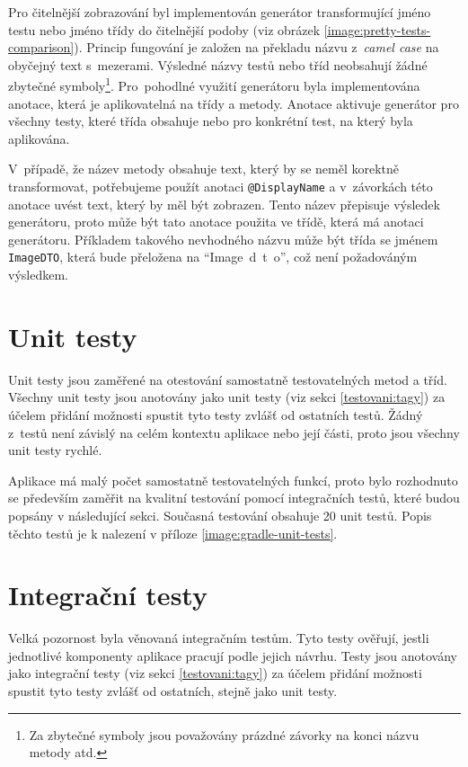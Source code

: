     Pro čitelnější zobrazování byl implementován generátor transformující jméno testu nebo jméno třídy do čitelnější podoby (viz obrázek \ref{image:pretty-tests-comparison}). Princip fungování je založen na překladu názvu z~\textit{camel case} na obyčejný text s~mezerami. Výsledné názvy testů nebo tříd neobsahují žádné zbytečné symboly\footnote{Za zbytečné symboly jsou považovány prázdné závorky na konci názvu metody atd.}. Pro~pohodlné využití generátoru byla implementována anotace, která je aplikovatelná na třídy a metody. Anotace aktivuje generátor pro všechny testy, které třída obsahuje nebo pro konkrétní test, na který byla aplikována.
    
    V~případě, že název metody obsahuje text, který by se neměl korektně transformovat, potřebujeme použít anotaci \verb|@DisplayName| a v~závorkách této anotace uvést text, který by měl být zobrazen. Tento název přepisuje výsledek generátoru, proto může být tato anotace použita ve třídě, která má anotaci generátoru. Příkladem takového nevhodného názvu může být třída se jménem \verb|ImageDTO|, která bude přeložena na \enquote{Image~d~t~o}, což není požadováným výsledkem.
    
\section{Unit testy}\label{testovani:unit}
    Unit testy jsou zaměřené na otestování samostatně testovatelných metod a tříd. Všechny unit testy jsou anotovány jako unit testy (viz sekci \ref{testovani:tagy}) za účelem přidání možnosti spustit tyto testy zvlášť od ostatních testů. Žádný z~testů není závislý na celém kontextu aplikace nebo její části, proto jsou všechny unit testy rychlé.
    
    Aplikace má malý počet samostatně testovatelných funkcí, proto bylo rozhodnuto se především zaměřit na kvalitní testování pomocí integračních testů, které budou popsány v následující sekci. Současná testování obsahuje 20 unit testů. Popis těchto testů je k nalezení v příloze \ref{image:gradle-unit-tests}.
    
\section{Integrační testy}\label{testovani:intergacni}
    Velká pozornost byla věnovaná integračním testům. Tyto testy ověřují, jestli jednotlivé komponenty aplikace pracují podle jejich návrhu. Testy jsou anotovány jako integrační testy (viz sekci \ref{testovani:tagy}) za účelem přidání možnosti spustit tyto testy zvlášť od ostatních, stejně jako unit testy. 
    
